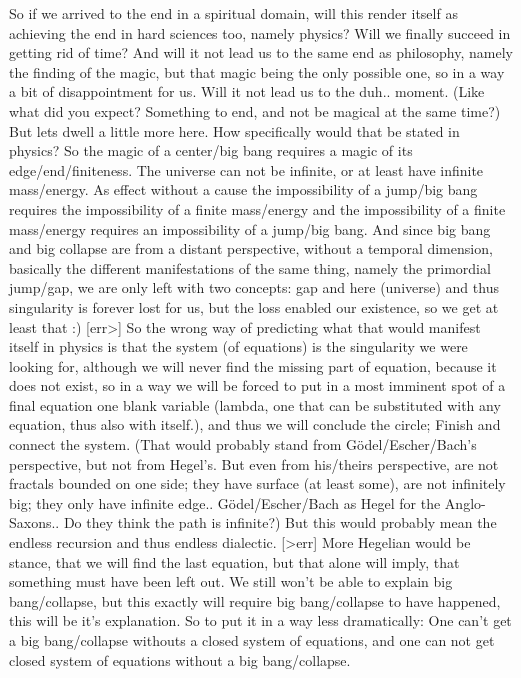 \documentclass[10pt]{book}
\begin{document}
So if we arrived to the end in a spiritual domain, will this render itself as achieving the end in hard sciences too, namely physics? Will we finally succeed in getting rid of time? And will it not lead us to the same end as philosophy, namely the finding of the magic, but that magic being the only possible one, so in a way a bit of disappointment for us. Will it not lead us to the duh.. moment. (Like what did you expect? Something to end, and not be magical at the same time?) But lets dwell a little more here. How specifically would that be stated in physics?
So the magic of a center/big bang requires a magic of its edge/end/finiteness. The universe can not be infinite, or at least have infinite mass/energy. As effect without a cause the impossibility of a jump/big bang requires the impossibility of a finite mass/energy and the impossibility of a finite mass/energy requires an impossibility of a jump/big bang. 
And since big bang and big collapse are from a distant perspective, without a temporal dimension, basically the different manifestations of the same thing, namely the primordial jump/gap, we are only left with two concepts: gap and here (universe) and thus singularity is forever lost for us, but the loss enabled our existence, so we get at least that :)
[err>] So the wrong way of predicting what that would manifest itself in physics is that the system (of equations) is the singularity we were looking for, although we will never find the missing part of equation, because it does not exist, so in a way we will be forced to put in a most imminent spot of a final equation one blank variable (lambda, one that can be substituted with any equation, thus also with itself.), and thus we will conclude the circle; Finish and connect the system.
(That would probably stand from Gödel/Escher/Bach's perspective, but not from Hegel's. But even from his/theirs perspective, are not fractals bounded on one side; they have surface (at least some), are not infinitely big; they only have infinite edge.. Gödel/Escher/Bach as Hegel for the Anglo-Saxons.. Do they think the path is infinite?) But this would probably mean the endless recursion and thus endless dialectic. [>err] More Hegelian would be stance, that we will find the last equation, but that alone will imply, that something must have been left out. We still won't be able to explain big bang/collapse, but this exactly will require big bang/collapse to have happened, this will be it's explanation.
So to put it in a way less dramatically: One can't get a big bang/collapse withouts a closed system of equations, and one can not get closed system of equations without a big bang/collapse. 
\end{document}

